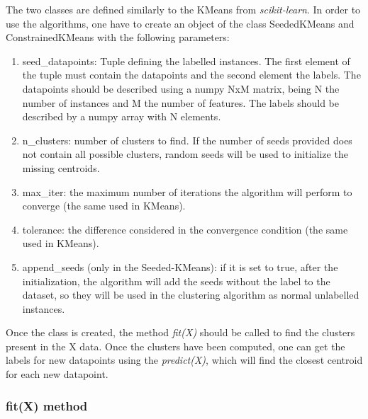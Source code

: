 \documentclass[11pt]{article}
\begin{document}
The two classes are defined similarly to the KMeans from \textit{scikit-learn}. In order to use the algorithms, one have to create an object of the class SeededKMeans and ConstrainedKMeans with the following parameters:
\begin{enumerate}
	\item seed\_datapoints: Tuple defining the labelled instances. The first element of the tuple must contain the datapoints and the second element the labels. The datapoints should be described using a numpy NxM matrix, being N the number of instances and M the number of features. The labels should be described by a numpy array with N elements. 
	\item n\_clusters: number of clusters to find. If the number of seeds provided does not contain all possible clusters, random seeds will be used to initialize the missing centroids. 
	\item max\_iter: the maximum number of iterations the algorithm will perform to converge (the same used in KMeans). 
	\item tolerance: the difference considered in the convergence condition (the same used in KMeans).
	\item append\_seeds (only in the Seeded-KMeans): if it is set to true, after the initialization, the algorithm will add the seeds without the label to the dataset, so they will be used in the clustering algorithm as normal unlabelled instances. 
\end{enumerate}

Once the class is created, the method \textit{fit(X)} should be called to find the clusters present in the X data. Once the clusters have been computed, one can get the labels for new datapoints using the \textit{predict(X)}, which will find the closest centroid for each new datapoint.

\subsubsection{fit(X) method}
\end{document}
